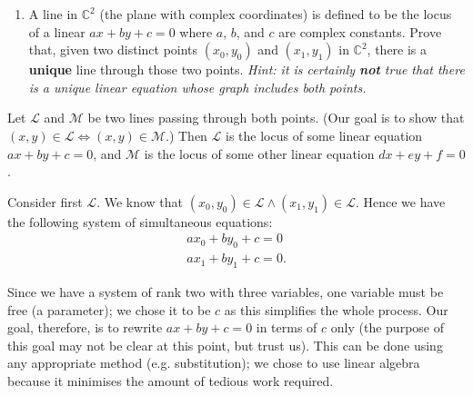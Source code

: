 \documentclass[a4paper,10pt]{article}
\newcommand{\answer}{\bfseries\color{Emerald}\refstepcounter{enumi}\item[\theenumi.]}
\begin{document}
\filbreak\begin{enumerate}[resume]
  \answer A line in $ \mathbb{C}^2 $ (the plane with complex coordinates) is defined to be the locus of a linear
        $ ax + by + c = 0 $ where $ a $, $ b $, and $ c $ are complex constants. Prove that, given two distinct points $ (x_0, y_0) $
        and $ (x_1, y_1) $ in $ \mathbb{C}^2 $, there is a \textbf{unique} line through those two points. \textit{Hint: it is certainly \textbf{not} true
        that there is a unique linear equation whose graph includes both points.}
\end{enumerate}

Let $ \mathcal{L} $ and $ \mathcal{M} $ be two lines passing through both points. (Our goal is to show
that $ (x,y) \in \mathcal{L} \iff (x,y) \in \mathcal{M} $.) Then $ \mathcal{L} $ is the locus of some
linear equation $ ax + by + c = 0 $, and $ \mathcal{M} $ is the locus of some other linear
equation $ dx + ey + f = 0 $.

Consider first $ \mathcal{L} $. We know that $ (x_0, y_0) \in \mathcal{L} \wedge (x_1, y_1) \in \mathcal{L} $. Hence we
have the following system of simultaneous equations:
\begin{align*}
  ax_0 + by_0 + c = 0\\
  ax_1 + by_1 + c = 0.
\end{align*}

Since we have a system of rank two with three variables, one variable must be free (a parameter); we chose it to be $ c $ as this
simplifies the whole process. Our goal, therefore, is to rewrite $ ax + by + c = 0 $ in terms of $ c $ only (the purpose of this
goal may not be clear at this point, but trust us). This can be done using any appropriate method (e.g. substitution); we chose to
use linear algebra because it minimises the amount of tedious work required.
\end{document}
